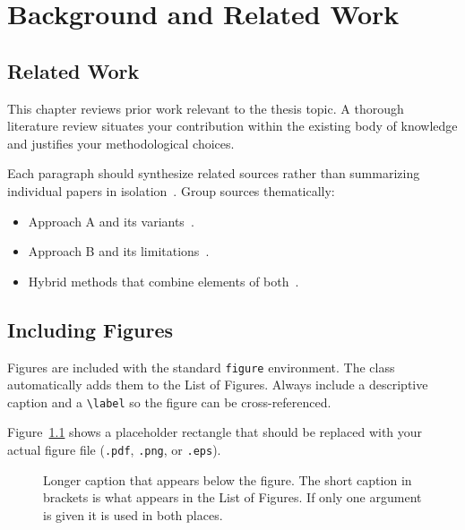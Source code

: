 
\chapter{Background and Related Work}
\label{ch:background}

\section{Related Work}
\label{sec:related}

This chapter reviews prior work relevant to the thesis topic.
A thorough literature review situates your contribution within the
existing body of knowledge and justifies your methodological choices.

Each paragraph should synthesize related sources rather than
summarizing individual papers in isolation~\cite{kopka1999guide}.
Group sources thematically:

\begin{itemize}
  \item Approach A and its variants~\cite{lamport1994latex}.
  \item Approach B and its limitations~\cite{knuth1986texbook}.
  \item Hybrid methods that combine elements of both~\cite{kopka1999guide}.
\end{itemize}

\section{Including Figures}
\label{sec:figures}

Figures are included with the standard \texttt{figure} environment.
The class automatically adds them to the List of Figures.
Always include a descriptive caption and a \verb|\label| so the figure
can be cross-referenced.

Figure~\ref{fig:example} shows a placeholder rectangle that should be
replaced with your actual figure file (\texttt{.pdf}, \texttt{.png},
or \texttt{.eps}).

\begin{figure}[htbp]
  \centering
  \setlength{\fboxsep}{0pt}
  \fbox{\rule{0pt}{6cm}\rule{10cm}{0pt}}
  \caption[Short caption for the List of Figures]{%
    Longer caption that appears below the figure.
    The short caption in brackets is what appears in the List of Figures.
    If only one argument is given it is used in both places.}
  \label{fig:example}
\end{figure}

